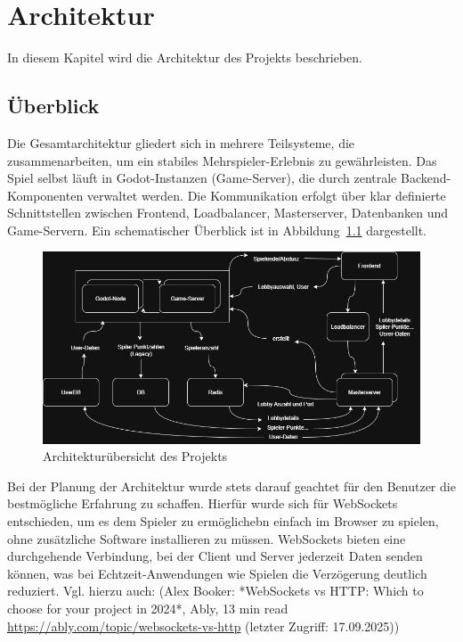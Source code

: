 \chapter{Architektur}
\label{chap:architektur}

In diesem Kapitel wird die Architektur des Projekts beschrieben. 

\section{Überblick}
Die Gesamtarchitektur gliedert sich in mehrere Teilsysteme, die zusammenarbeiten, um ein stabiles Mehrspieler-Erlebnis zu gewährleisten. 
Das Spiel selbst läuft in Godot-Instanzen (Game-Server), die durch zentrale Backend-Komponenten verwaltet werden. 
Die Kommunikation erfolgt über klar definierte Schnittstellen zwischen Frontend, Loadbalancer, Masterserver, Datenbanken und Game-Servern. 
Ein schematischer Überblick ist in Abbildung~\ref{fig:architektur} dargestellt.

\begin{figure}[h!]
  \centering
  \includegraphics[width=0.95\linewidth]{../images/content.png}
  \caption{Architekturübersicht des Projekts}
  \label{fig:architektur}
\end{figure}


Bei der Planung der Architektur wurde stets darauf geachtet für den Benutzer die bestmögliche Erfahrung zu schaffen.
Hierfür wurde sich für WebSockets entschieden, um es dem Spieler zu ermöglichebn einfach im Browser zu spielen, ohne zusätzliche Software installieren zu müssen.
WebSockets bieten eine durchgehende Verbindung, bei der Client und Server jederzeit Daten senden können, was bei Echtzeit-Anwendungen wie Spielen die Verzögerung deutlich reduziert.
Vgl. hierzu auch:
(Alex Booker: *WebSockets vs HTTP: Which to choose for your project in 2024*, Ably, 13 min read \url{https://ably.com/topic/websockets-vs-http} (letzter Zugriff: 17.09.2025))


